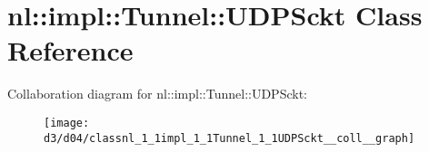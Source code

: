 \hypertarget{classnl_1_1impl_1_1Tunnel_1_1UDPSckt}{}\section{nl\+:\+:impl\+:\+:Tunnel\+:\+:U\+D\+P\+Sckt Class Reference}
\label{classnl_1_1impl_1_1Tunnel_1_1UDPSckt}


Collaboration diagram for nl\+:\+:impl\+:\+:Tunnel\+:\+:U\+D\+P\+Sckt\+:\nopagebreak
\begin{figure}[H]
\begin{center}
\leavevmode
\texttt{[image: d3/d04/classnl\_1\_1impl\_1\_1Tunnel\_1\_1UDPSckt\_\_coll\_\_graph]}
\end{center}
\end{figure}
